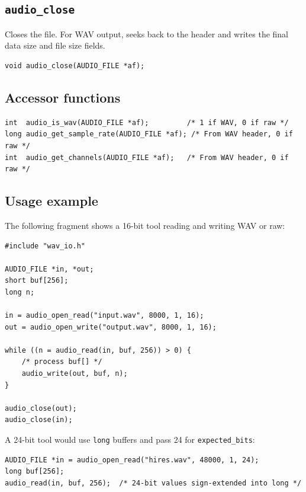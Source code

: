 \subsection{{\tt audio\_close}}

Closes the file. For WAV output, seeks back to the header and writes the
final data size and file size fields.

{\small
\begin{verbatim}
void audio_close(AUDIO_FILE *af);
\end{verbatim}
}

\subsection{Accessor functions}

{\small
\begin{verbatim}
int  audio_is_wav(AUDIO_FILE *af);         /* 1 if WAV, 0 if raw */
long audio_get_sample_rate(AUDIO_FILE *af); /* From WAV header, 0 if raw */
int  audio_get_channels(AUDIO_FILE *af);   /* From WAV header, 0 if raw */
\end{verbatim}
}

\subsection{Usage example}

The following fragment shows a 16-bit tool reading and writing WAV or raw:

{\small
\begin{verbatim}
#include "wav_io.h"

AUDIO_FILE *in, *out;
short buf[256];
long n;

in = audio_open_read("input.wav", 8000, 1, 16);
out = audio_open_write("output.wav", 8000, 1, 16);

while ((n = audio_read(in, buf, 256)) > 0) {
    /* process buf[] */
    audio_write(out, buf, n);
}

audio_close(out);
audio_close(in);
\end{verbatim}
}

A 24-bit tool would use {\tt long} buffers and pass 24 for {\tt expected\_bits}:

{\small
\begin{verbatim}
AUDIO_FILE *in = audio_open_read("hires.wav", 48000, 1, 24);
long buf[256];
audio_read(in, buf, 256);  /* 24-bit values sign-extended into long */
\end{verbatim}
}

